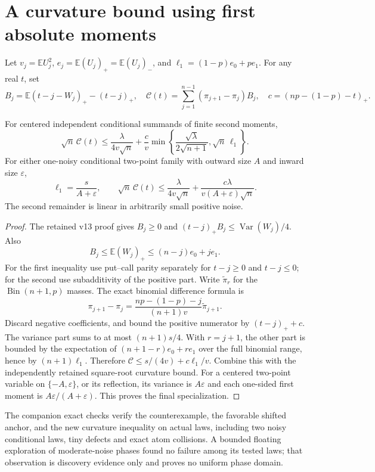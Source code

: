 \documentclass[11pt,a4paper]{article}
\newcommand{\E}{\mathbb E}\newcommand{\Pp}{\mathbb P}
\begin{document}
\section{A curvature bound using first absolute moments}
Let $v_j=\E U_j^2$, $e_j=\E(U_j)_+=\E(U_j)_-$, and
$\ell_1=(1-p)e_0+pe_1$. For any real $t$, set
\[
 B_j=\E(t-j-W_j)_+-(t-j)_+,\quad
 \mathcal C(t)=\sum_{j=1}^{n-1}(\pi_{j+1}-\pi_j)B_j,\quad
 c=(np-(1-p)-t)_+.
\]
\begin{lemma}\label{lem:firstmoment}
For centered independent conditional summands of finite second moments,
\[
 \sqrt n\,\mathcal C(t)
 \le\frac\lambda{4v\sqrt n}
 +\frac c v\min\left\{
       \frac{\sqrt\lambda}{2\sqrt{n+1}},\sqrt n\,\ell_1\right\}.
\]
For either one-noisy conditional two-point family with outward size $A$
and inward size $\varepsilon$,
\[
 \ell_1=\frac s{A+\varepsilon},\qquad
 \sqrt n\,\mathcal C(t)
 \le\frac\lambda{4v\sqrt n}
             +\frac{c\lambda}{v(A+\varepsilon)\sqrt n}.
\]
The second remainder is linear in arbitrarily small positive noise.
\end{lemma}
\begin{proof}
The retained v13 proof gives $B_j\ge0$ and
$(t-j)_+B_j\le\operatorname{Var}(W_j)/4$. Also
\[
 B_j\le\E(W_j)_+\le(n-j)e_0+je_1.
\]
For the first inequality use put--call parity separately for $t-j\ge0$
and $t-j\le0$; for the second use subadditivity of the positive part.
Write $\widetilde\pi_r$ for the $\operatorname{Bin}(n+1,p)$ masses.
The exact binomial difference formula is
\[
 \pi_{j+1}-\pi_j
 =\frac{np-(1-p)-j}{(n+1)v}\widetilde\pi_{j+1}.
\]
Discard negative coefficients, and bound the positive numerator by
$(t-j)_++c$. The variance part sums to at most $(n+1)s/4$.
With $r=j+1$, the other part is bounded by the expectation of
$(n+1-r)e_0+re_1$ over the full binomial range, hence by
$(n+1)\ell_1$. Therefore
$\mathcal C\le s/(4v)+c\ell_1/v$.
Combine this with the independently retained square-root curvature bound.
For a centered two-point variable on $\{-A,\varepsilon\}$, or its reflection,
its variance is $A\varepsilon$ and each one-sided first moment is
$A\varepsilon/(A+\varepsilon)$. This proves the final specialization.
\end{proof}

The companion exact checks verify the counterexample, the favorable shifted
anchor, and the new curvature inequality on actual laws, including two noisy
conditional laws, tiny defects and exact atom collisions. A bounded floating
exploration of moderate-noise phases found no failure among its tested laws;
that observation is discovery evidence only and proves no uniform phase domain.
\end{document}
